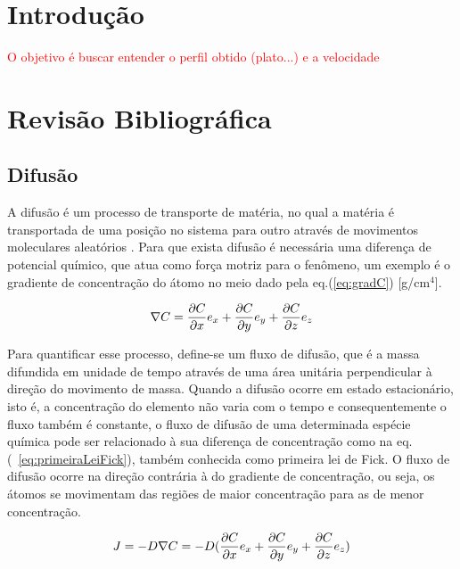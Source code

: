 \documentclass[]{politex}
\newcommand\myworries[1]{\textcolor{red}{#1}}
\begin{document}
\capa


\listadefiguras
\listadetabelas

\sumario


\chapter{Introdução}

\myworries{O objetivo é buscar entender o perfil obtido (plato...) e a velocidade}

\chapter{Revisão Bibliográfica}
\section{Difusão}
\label{sec:difusao}
	A difusão é um processo de transporte de matéria, no qual a matéria é transportada de uma posição no sistema para outro através de movimentos moleculares aleatórios \cite{crank1979mathematics}. Para que exista difusão é necessária uma diferença de potencial químico, que atua como força motriz para o fenômeno, um exemplo é o gradiente de concentração do átomo no meio dado pela eq.(\ref{eq:gradC}) [g/cm$^4$]. 

\begin{equation} \label{eq:gradC}
\nabla C = \pdv{C}{x}e_x + \pdv{C}{y}e_y + \pdv{C}{z}e_z
\end{equation}

Para quantificar esse processo, define-se um fluxo de difusão, que é a massa difundida em unidade de tempo através de uma área unitária perpendicular à direção do movimento de massa. Quando a difusão ocorre em estado estacionário, isto é, a concentração do elemento não varia com o tempo e consequentemente o fluxo também é constante, o fluxo de difusão de uma determinada espécie química pode ser relacionado à sua diferença de concentração como na eq.(~\ref{eq:primeiraLeiFick}), também conhecida como primeira lei de Fick. O fluxo de difusão ocorre na direção contrária à do gradiente de concentração, ou seja, os átomos se movimentam das regiões de maior concentração para as de menor concentração.

\begin{equation} \label{eq:primeiraLeiFick}
J = -D\nabla C = -D(\pdv{C}{x}e_x + \pdv{C}{y}e_y + \pdv{C}{z}e_z)
\end{equation}
\end{document}

